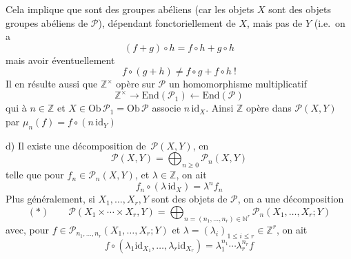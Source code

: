 \documentclass[11pt,a4paper]{article}
\begin{document}
Cela implique que  
 sont des groupes abéliens (car les objets $X$  sont \struck{\ill{}} des objets groupes abéliens de
$\mathcal{P}$), dépendant fonctoriellement de $X$, mais pas de $Y$
(i.e.\ on a
\[
\boxed{(f + g) \circ h = f \circ h + g \circ h}
\]
mais \struck{\ill{}} \struck{\ill{}}  avoir
éventuellement
\[
f \circ (g + h) \neq f \circ g + f \circ h \ !
\]
Il en résulte aussi que $\mathbb{Z}^{\times}$ opère sur $\mathcal{P}$
 un homomorphisme multiplicatif
\[
\mathbb{Z}^{\times} \longrightarrow \mathrm{End}(\mathcal{P}_1)
\longleftarrow \mathrm{End}(\mathcal{P})
\]
qui à $n \in \mathbb{Z}$ et $X \in \mathrm{Ob}\,\mathcal{P}_1 =
\mathrm{Ob}\,\mathcal{P}$ associe $n\,\mathrm{id}_X$.
Ainsi $\mathbb{Z}$ opère dans \struck{\ill{}}
$\mathcal{P}(X, Y)$ par $\mu_n(f) = f \circ (n\,\mathrm{id}_Y)$

d) Il existe une décomposition de
\,$\mathcal{P}(X, Y)$, en
\[
\mathcal{P}(X, Y) = \bigoplus_{n \geq 0} \mathcal{P}_n(X, Y)
\]
telle que pour $f_n \in \mathcal{P}_n(X, Y)$, et $\lambda \in \mathbb{Z}$,
on ait
\[
f_n \circ (\lambda\,\mathrm{id}_X) = \lambda^{n} f_n
\]
Plus généralement, si $X_1, \ldots, X_r, Y$ sont des objets de
$\mathcal{P}$, on a une décomposition
\[
(*) \qquad \mathcal{P}(X_1 \times \cdots \times X_r, Y) =
\bigoplus_{n = (n_1, \ldots, n_r) \in \mathbb{N}^{r}}
\mathcal{P}_n(X_1, \ldots, X_r; Y)
\]
avec, pour $f \in \mathcal{P}_{n_1, \ldots, n_r}(X_1, \ldots, X_r; Y)$ et
$\lambda = (\lambda_i)_{1 \leq i \leq r} \in \mathbb{Z}^{r}$, on ait
\[
f \circ (\lambda_1 \mathrm{id}_{X_1}, \ldots, \lambda_r \mathrm{id}_{X_r})
= \lambda_1^{n_1} \cdots \lambda_r^{n_r} f
\]
\end{document}
